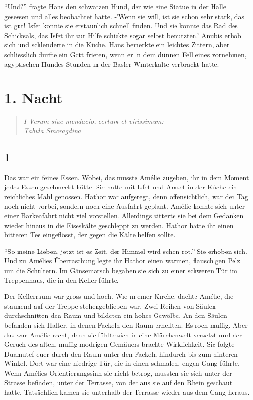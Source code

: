 \documentclass[11pt,titlepage,a5paper]{book}
\begin{document}
"`Und?"' fragte Hans den schwarzen Hund, der wie eine Statue in der Halle gesessen und alles beobachtet hatte. -'Wenn sie will, ist sie schon sehr stark, das ist gut! Isfet konnte sie erstaunlich schnell finden. Und sie konnte das Rad des Schicksals, das Isfet ihr zur Hilfe schickte sogar selbst benutzten.' Anubis erhob sich und schlenderte in die Küche. Hans bemerkte ein leichtes Zittern, aber schliesslich durfte ein Gott frieren, wenn er in dem dünnen Fell eines vornehmen, ägyptischen Hundes Stunden in der Basler Winterkälte verbracht hatte.

\chapter*{1. Nacht}

\begin{quotation}

\emph{I Verum sine mendacio, certum et virissimum:\\Tabula Smaragdina}

\end{quotation}

\section*{1}

Das war ein feines Essen. Wobei, das musste Amélie zugeben, ihr in dem Moment jedes Essen geschmeckt hätte. Sie hatte mit Isfet und Amset in der Küche ein reichliches Mahl genossen. Hathor war aufgeregt, denn offensichtlich, war der Tag noch nicht vorbei, sondern noch eine Ausfahrt geplant. Amélie konnte sich unter einer Barkenfahrt nicht viel vorstellen. Allerdings zitterte sie bei dem Gedanken wieder hinaus in die Eiseskälte geschleppt zu werden. Hathor hatte ihr einen bitteren Tee eingeflösst, der gegen die Kälte helfen sollte.

"`So meine Lieben, jetzt ist es Zeit, der Himmel wird schon rot."' Sie erhoben sich. Und zu Amélies Überraschung legte ihr Hathor einen warmen, flauschigen Pelz um die Schultern. Im Gänsemarsch begaben sie sich zu einer schweren Tür im Treppenhaus, die in den Keller führte. 

Der Kellerraum war gross und hoch. Wie in einer Kirche, dachte Amélie, die staunend auf der Treppe stehengeblieben war. Zwei Reihen von Säulen durchschnitten den Raum und bildeten ein hohes Gewölbe. An den Säulen befanden sich Halter, in denen Fackeln den Raum erhellten. Es roch muffig. Aber das war Amélie recht, denn sie fühlte sich in eine Märchenwelt versetzt und der Geruch des alten, muffig-modrigen Gemäuers brachte Wirklichkeit. Sie folgte Duamutef quer durch den Raum unter den Fackeln hindurch bis zum hinteren Winkel. Dort war eine niedrige Tür, die in einen schmalen, engen Gang führte. Wenn Amélies Orientierungssinn sie nicht betrog, mussten sie sich unter der Strasse befinden, unter der Terrasse, von der aus sie auf den Rhein geschaut hatte. Tatsächlich kamen sie unterhalb der Terrasse wieder aus dem Gang heraus. 
\end{document}

